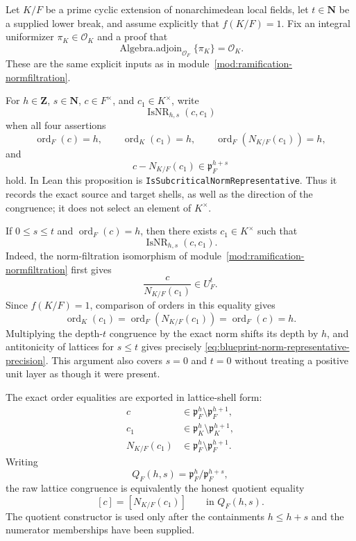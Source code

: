 \begin{lemma}\label{mod:ramification-normrepresentatives}
Let $K/F$ be a prime cyclic extension of nonarchimedean local fields, let
$t\in\mathbf N$ be a supplied lower break, and assume explicitly that
$f(K/F)=1$.  Fix an integral uniformizer $\pi_K\in\mathcal O_K$ and a
proof that
\[
 \operatorname{Algebra.adjoin}_{\mathcal O_F}\{\pi_K\}=\mathcal O_K.
\]
These are the same explicit inputs as in
module~\ref{mod:ramification-normfiltration}.

For $h\in\mathbf Z$, $s\in\mathbf N$, $c\in F^\times$, and
$c_1\in K^\times$, write
\[
 \operatorname{IsNR}_{h,s}(c,c_1)
\]
when all four assertions
\[
 \operatorname{ord}_F(c)=h,
 \qquad \operatorname{ord}_K(c_1)=h,
 \qquad \operatorname{ord}_F(N_{K/F}(c_1))=h,
\]
and
\begin{equation}\label{eq:blueprint-norm-representative-precision}
 c-N_{K/F}(c_1)\in\mathfrak p_F^{h+s}
\end{equation}
hold.  In Lean this proposition is
\texttt{IsSubcriticalNormRepresentative}.  Thus it records the exact
source and target shells, as well as the direction of the congruence; it
does not select an element of $K^\times$.

If $0\le s\le t$ and $\operatorname{ord}_F(c)=h$, then there exists
$c_1\in K^\times$ such that
\[
 \operatorname{IsNR}_{h,s}(c,c_1).
\]
Indeed, the norm-filtration isomorphism of
module~\ref{mod:ramification-normfiltration} first gives
\[
 \frac{c}{N_{K/F}(c_1)}\in U_F^t.
\]
Since $f(K/F)=1$, comparison of orders in this equality gives
\[
 \operatorname{ord}_K(c_1)
 =\operatorname{ord}_F(N_{K/F}(c_1))
 =\operatorname{ord}_F(c)=h.
\]
Multiplying the depth-$t$ congruence by the exact norm shifts its depth by
$h$, and antitonicity of lattices for $s\le t$ gives precisely
\eqref{eq:blueprint-norm-representative-precision}.  This argument also
covers $s=0$ and $t=0$ without treating a positive unit layer as though it
were present.

The exact order equalities are exported in lattice-shell form:
\[
 \begin{aligned}
 c&\in\mathfrak p_F^h\setminus\mathfrak p_F^{h+1},\\
 c_1&\in\mathfrak p_K^h\setminus\mathfrak p_K^{h+1},\\
 N_{K/F}(c_1)&\in\mathfrak p_F^h\setminus\mathfrak p_F^{h+1}.
 \end{aligned}
\]
Writing
\[
 Q_F(h,s)=\mathfrak p_F^h/\mathfrak p_F^{h+s},
\]
the raw lattice congruence is equivalently the honest quotient equality
\[
 [c]=[N_{K/F}(c_1)]\qquad\text{in }Q_F(h,s).
\]
The quotient constructor is used only after the containments
$h\le h+s$ and the numerator memberships have been supplied.


\end{lemma}
